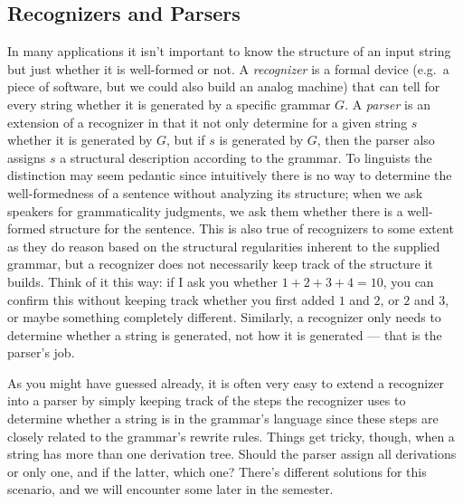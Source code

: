 \subsection{Recognizers and Parsers}
\label{sub:BigPicture_Parsing}

In many applications it isn't important to know the structure of an input string but just whether it is well-formed or not.
A \emph{recognizer} is a formal device (e.g.\ a piece of software, but we could also build an analog machine) that can tell for every string whether it is generated by a specific grammar $G$.
A \emph{parser} is an extension of a recognizer in that it not only determine for a given string $s$ whether it is generated by $G$, but if $s$ is generated by $G$, then the parser also assigns $s$ a structural description according to the grammar.
To linguists the distinction may seem pedantic since intuitively there is no way to determine the well-formedness of a sentence without analyzing its structure;
when we ask speakers for grammaticality judgments, we ask them whether there is a well-formed structure for the sentence.
This is also true of recognizers to some extent as they do reason based on the structural regularities inherent to the supplied grammar, but a recognizer does not necessarily keep track of the structure it builds.
Think of it this way: if I ask you whether $1+2+3+4 = 10$, you can confirm this without keeping track whether you first added $1$ and $2$, or $2$ and $3$, or maybe something completely different.
Similarly, a recognizer only needs to determine whether a string is generated, not how it is generated --- that is the parser's job.

%
As you might have guessed already, it is often very easy to extend a recognizer into a parser by simply keeping track of the steps the recognizer uses to determine whether a string is in the grammar's language since these steps are closely related to the grammar's rewrite rules.
Things get tricky, though, when a string has more than one derivation tree.
Should the parser assign all derivations or only one, and if the latter, which one?
There's different solutions for this scenario, and we will encounter some later in the semester.

